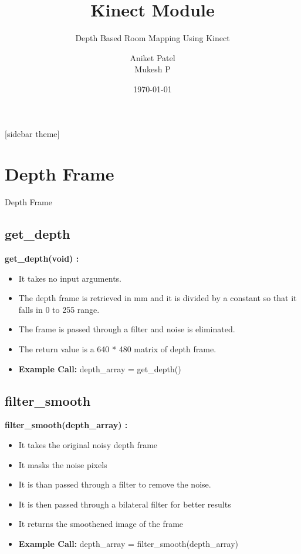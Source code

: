 \documentclass[10pt, a4paper]{beamer}
\begin{document}
	\title{Kinect Module}
	\subtitle{Depth Based Room Mapping Using Kinect}
	\author{Aniket Patel\\ Mukesh P}
	\date{\today}
	\frame{\titlepage}

[sidebar theme]
\section{Depth Frame}
\begin{frame}[allowframebreaks]{Depth Frame}
  \subsection{get\_depth}
    \textbf{get\_depth(void) : }
    \begin{itemize}
     \item It takes no input arguments.
     \item The depth frame is retrieved in mm and it is divided by a constant so that it falls in 0 to 255 range.
     \item The frame is passed through a filter and noise is eliminated.
     \item The return value is a 640 * 480 matrix of depth frame.
     \item \textbf{Example Call:} depth\_array = get\_depth()
    \end{itemize}
  \framebreak
  \subsection{filter\_smooth}
    \textbf{filter\_smooth(depth\_array) : }
    \begin{itemize}
     \item It takes the original noisy depth frame
     \item It masks the noise pixels
     \item It is than passed through a filter to remove the noise. 
     \item It is then passed through a bilateral filter for better results
     \item It returns the smoothened image of the frame
     \item \textbf{Example Call:} depth\_array = filter\_smooth(depth\_array)
    \end{itemize}
  \framebreak

\end{frame}
\end{document}
